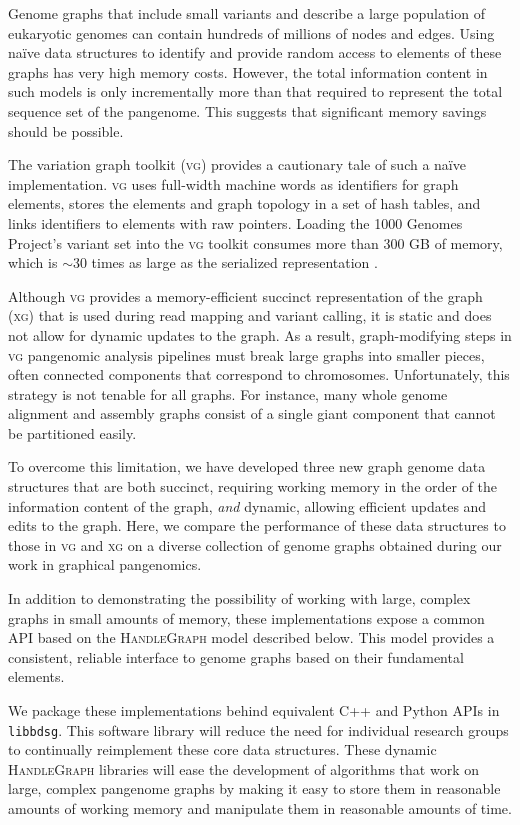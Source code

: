 \documentclass{article}
\begin{document}
Genome graphs that include small variants and describe a large population of eukaryotic genomes can contain hundreds of millions of nodes and edges.
Using na\"ive data structures to identify and provide random access to elements of these graphs has very high memory costs.
However, the total information content in such models is only incrementally more than that required to represent the total sequence set of the pangenome.
This suggests that significant memory savings should be possible.

The variation graph toolkit (\textsc{vg}) \cite{Garrison_2018} provides a cautionary tale of such a na\"ive implementation.
\textsc{vg} uses full-width machine words as identifiers for graph elements, stores the elements and graph topology in a set of hash tables, and links identifiers to elements with raw pointers.
Loading the 1000 Genomes Project's variant set into the \textsc{vg} toolkit consumes more than 300 GB of memory, which is $\sim$30 times as large as the serialized representation \cite{Garrison_2019}.

Although \textsc{vg} provides a memory-efficient succinct representation of the graph (\textsc{xg}) that is used during read mapping and variant calling, it is static and does not allow for dynamic updates to the graph.
As a result, graph-modifying steps in \textsc{vg} pangenomic analysis pipelines must break large graphs into smaller pieces, often connected components that correspond to chromosomes.
Unfortunately, this strategy is not tenable for all graphs.
For instance, many whole genome alignment and assembly graphs consist of a single giant component that cannot be partitioned easily.

To overcome this limitation, we have developed three new graph genome data structures that are both succinct, requiring working memory in the order of the information content of the graph, \emph{and} dynamic, allowing efficient updates and edits to the graph.
Here, we compare the performance of these data structures to those in \textsc{vg} and \textsc{xg} on a diverse collection of genome graphs obtained during our work in graphical pangenomics.

In addition to demonstrating the possibility of working with large, complex graphs in small amounts of memory, these implementations expose a common API based on the \textsc{HandleGraph} model described below.
This model provides a consistent, reliable interface to genome graphs based on their fundamental elements.

We package these implementations behind equivalent C++ and Python APIs in \texttt{libbdsg}.
This software library will reduce the need for individual research groups to continually reimplement these core data structures.
These dynamic \textsc{HandleGraph} libraries will ease the development of algorithms that work on large, complex pangenome graphs by making it easy to store them in reasonable amounts of working memory and manipulate them in reasonable amounts of time.
\end{document}

